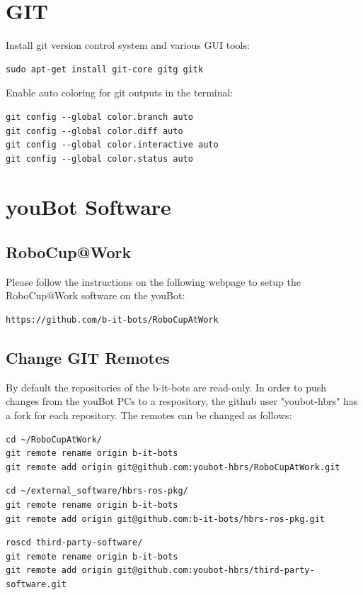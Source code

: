 \documentclass[a4paper,12pt]{article}
\begin{document}
\newpage
\section{GIT}
Install git version control system and various GUI tools:
\begin{lstlisting}
sudo apt-get install git-core gitg gitk
\end{lstlisting}

Enable auto coloring for git outputs in the terminal:
\begin{lstlisting}
git config --global color.branch auto
git config --global color.diff auto
git config --global color.interactive auto
git config --global color.status auto
\end{lstlisting}



\newpage
\section{youBot Software}

\subsection{RoboCup@Work}
Please follow the instructions on the following webpage to setup the RoboCup@Work software on the youBot:
\begin{lstlisting}
https://github.com/b-it-bots/RoboCupAtWork
\end{lstlisting}

\subsection{Change GIT Remotes}
By default the repositories of the b-it-bots are read-only. In order to push changes from the youBot PCs to a respository, the github user "youbot-hbrs" has a fork for each repository. The remotes can be changed as follows:
\begin{lstlisting}
cd ~/RoboCupAtWork/
git remote rename origin b-it-bots
git remote add origin git@github.com:youbot-hbrs/RoboCupAtWork.git
\end{lstlisting}

\begin{lstlisting}
cd ~/external_software/hbrs-ros-pkg/
git remote rename origin b-it-bots
git remote add origin git@github.com:b-it-bots/hbrs-ros-pkg.git
\end{lstlisting}

\begin{lstlisting}
roscd third-party-software/
git remote rename origin b-it-bots
git remote add origin git@github.com:youbot-hbrs/third-party-software.git
\end{lstlisting}
\end{document}
